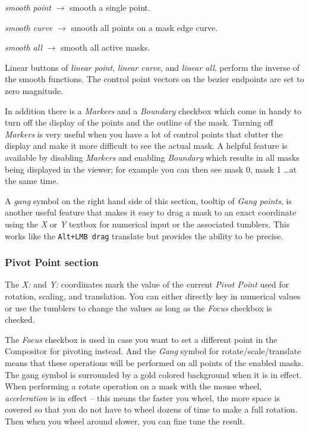 \textit{smooth point}	$\rightarrow$ smooth a single point.

\textit{smooth curve}	$\rightarrow$ smooth all points on a mask edge curve.

\textit{smooth all} 	$\rightarrow$ smooth all active masks.

Linear buttons of \textit{linear point}, \textit{linear curve}, and \textit{linear all}, perform the inverse of the smooth functions.
The control point vectors on the bezier endpoints are set to zero magnitude.

In addition there is a \textit{Markers} and a \textit{Boundary} checkbox which come in handy to turn off the display of the points and the outline of the mask.  Turning off \textit{Markers} is very useful when you have a lot of control points that clutter the display and make it more difficult to see the actual mask.  A helpful feature is available by disabling \textit{Markers} and enabling \textit{Boundary} which results in all masks being displayed in the viewer; for example you can then see mask 0, mask 1 \dots at the same time.

A \textit{gang} symbol on the right hand side of this section, tooltip of \textit{Gang points}, is another useful feature that makes it easy to drag a mask to an exact coordinate using the \textit{X} or \textit{Y} textbox for numerical input or the associated tumblers.  This works like the \texttt{Alt+LMB drag} translate but provides the ability to be precise.

\subsubsection*{Pivot Point section}%
\label{ssub:pivot_point_section}

The \textit{X:} and \textit{Y:} coordinates mark the value of the current \textit{Pivot Point} used for rotation, scaling, and translation.  You can either directly key in numerical values or use the tumblers to change the values as long as the \textit{Focus} checkbox is checked.

The \textit{Focus} checkbox is used in case you want to set a different point in the Compositor for pivoting instead.  And the \textit{Gang} symbol for rotate/scale/translate means that these operations will be performed on all points of the enabled masks.  The gang symbol is surrounded by a gold colored background when it is in effect.  When performing a rotate operation on a mask with the mouse wheel, \textit{acceleration} is in effect -- this means the faster you wheel, the more space is covered so that you do not have to wheel dozens of time to make a full rotation.  Then when you wheel around slower, you can fine tune the result.

